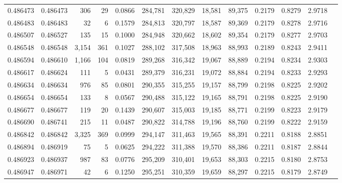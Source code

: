 \begin{tabular}{rrrrrrrrrrrrr}
0.486473 & 0.486473 &   306 &    29 &                                     0.0866 & 284,781 & 320,829 &  18,581 &  89,375 & 0.2179 & 0.8279 & 2.9718 \\
0.486483 & 0.486483 &    32 &     6 &                                     0.1579 & 284,813 & 320,797 &  18,587 &  89,369 & 0.2179 & 0.8278 & 2.9716 \\
0.486507 & 0.486527 &   135 &    15 &                                     0.1000 & 284,948 & 320,662 &  18,602 &  89,354 & 0.2179 & 0.8277 & 2.9703 \\
0.486548 & 0.486548 & 3,154 &   361 &                                     0.1027 & 288,102 & 317,508 &  18,963 &  88,993 & 0.2189 & 0.8243 & 2.9411 \\
0.486594 & 0.486610 & 1,166 &   104 &                                     0.0819 & 289,268 & 316,342 &  19,067 &  88,889 & 0.2194 & 0.8234 & 2.9303 \\
0.486617 & 0.486624 &   111 &     5 &                                     0.0431 & 289,379 & 316,231 &  19,072 &  88,884 & 0.2194 & 0.8233 & 2.9293 \\
0.486634 & 0.486634 &   976 &    85 &                                     0.0801 & 290,355 & 315,255 &  19,157 &  88,799 & 0.2198 & 0.8225 & 2.9202 \\
0.486654 & 0.486654 &   133 &     8 &                                     0.0567 & 290,488 & 315,122 &  19,165 &  88,791 & 0.2198 & 0.8225 & 2.9190 \\
0.486677 & 0.486677 &   119 &    20 &                                     0.1439 & 290,607 & 315,003 &  19,185 &  88,771 & 0.2199 & 0.8223 & 2.9179 \\
0.486690 & 0.486741 &   215 &    11 &                                     0.0487 & 290,822 & 314,788 &  19,196 &  88,760 & 0.2199 & 0.8222 & 2.9159 \\
0.486842 & 0.486842 & 3,325 &   369 &                                     0.0999 & 294,147 & 311,463 &  19,565 &  88,391 & 0.2211 & 0.8188 & 2.8851 \\
0.486894 & 0.486919 &    75 &     5 &                                     0.0625 & 294,222 & 311,388 &  19,570 &  88,386 & 0.2211 & 0.8187 & 2.8844 \\
0.486923 & 0.486937 &   987 &    83 &                                     0.0776 & 295,209 & 310,401 &  19,653 &  88,303 & 0.2215 & 0.8180 & 2.8753 \\
0.486947 & 0.486971 &    42 &     6 &                                     0.1250 & 295,251 & 310,359 &  19,659 &  88,297 & 0.2215 & 0.8179 & 2.8749 \\

\end{tabular}
